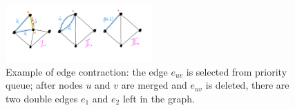 
\begin{figure}
\centering
\includegraphics[width=0.50\textwidth,trim=0.in 0.in 0.in 0.in,clip]{./figs/edge_contraction.png}
\caption{\small 
Example of edge contraction: the edge $e_{uv}$ is selected from priority queue; after nodes $u$ and $v$ are merged and $e_{uv}$ is deleted, there are two double edges $e_1$ and $e_2$ left in the graph.  
\label{fig:example_non_unique_weights_1}}
\end{figure}

